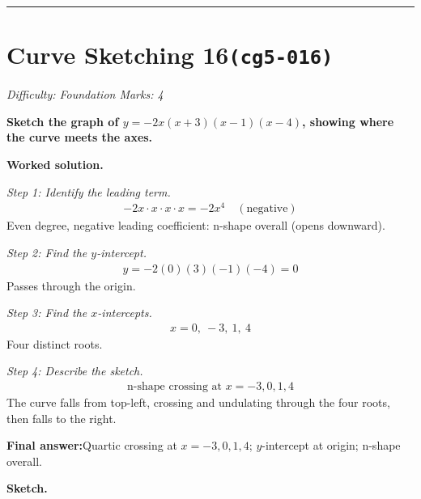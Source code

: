 \documentclass[11pt]{article}
\newcommand{\question}[1]{\par\medskip\noindent\textbf{#1}\par}
\begin{document}
\medskip\hrule

\section*{Curve Sketching 16\quad\small\texttt{(cg5-016)}}
\textit{Difficulty: Foundation \quad\textbar\quad Marks: 4}

\question{Sketch the graph of \( y = -2x(x + 3)(x - 1)(x - 4) \), showing where the curve meets the axes.}

\textbf{Worked solution.}

\textit{Step 1: Identify the leading term.}
\[\begin{gathered}
-2x \cdot x \cdot x \cdot x = -2x^4 \quad (\text{negative})
\end{gathered}\]
Even degree, negative leading coefficient: n-shape overall (opens downward).

\textit{Step 2: Find the \( y \)-intercept.}
\[\begin{gathered}
y = -2(0)(3)(-1)(-4) = 0
\end{gathered}\]
Passes through the origin.

\textit{Step 3: Find the \( x \)-intercepts.}
\[\begin{gathered}
x = 0,\ -3,\ 1,\ 4
\end{gathered}\]
Four distinct roots.

\textit{Step 4: Describe the sketch.}
\[\begin{gathered}
\text{n-shape crossing at } x = -3, 0, 1, 4
\end{gathered}\]
The curve falls from top-left, crossing and undulating through the four roots, then falls to the right.

\begin{answerbox}
\textbf{Final answer:}\quad Quartic crossing at \(\displaystyle x = -3, 0, 1, 4\); \(\displaystyle y\)-intercept at origin; n-shape overall.
\end{answerbox}
\textbf{Sketch.}
\end{document}
